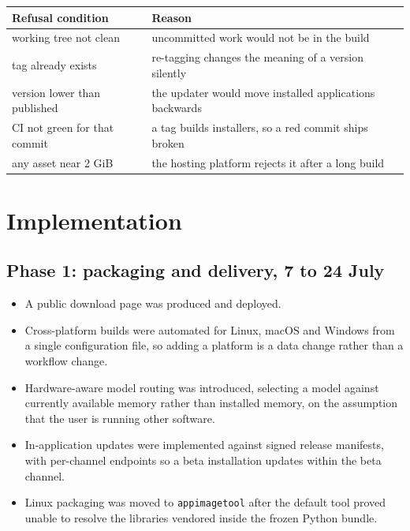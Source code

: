 \documentclass[11pt,a4paper]{article}
\begin{document}
\begin{center}
\small
\begin{tabularx}{\linewidth}{@{}lX@{}}
\toprule
\textbf{Refusal condition} & \textbf{Reason} \\
\midrule
working tree not clean & uncommitted work would not be in the build \\
tag already exists & re-tagging changes the meaning of a version silently \\
version lower than published & the updater would move installed applications backwards \\
CI not green for that commit & a tag builds installers, so a red commit ships broken \\
any asset near 2 GiB & the hosting platform rejects it after a long build \\
\bottomrule
\end{tabularx}
\end{center}

\section{Implementation}

\subsection{Phase 1: packaging and delivery, 7 to 24 July}

\begin{itemize}[leftmargin=*]
  \item A public download page was produced and deployed.
  \item Cross-platform builds were automated for Linux, macOS and Windows from a
        single configuration file, so adding a platform is a data change rather
        than a workflow change.
  \item Hardware-aware model routing was introduced, selecting a model against
        currently available memory rather than installed memory, on the
        assumption that the user is running other software.
  \item In-application updates were implemented against signed release
        manifests, with per-channel endpoints so a beta installation updates
        within the beta channel.
  \item Linux packaging was moved to \texttt{appimagetool} after the default
        tool proved unable to resolve the libraries vendored inside the frozen
        Python bundle.
\end{itemize}
\end{document}
